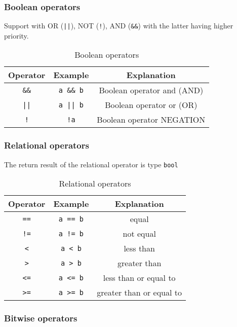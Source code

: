 \subsubsection*{Boolean operators}

Support with OR (\verb!||!), NOT (\verb|!|), AND (\verb|&&|) with the latter having higher priority.

\begin{table}
\centering
\begin{tabular}{c|c|c}
    Operator & Example & Explanation \\ \hline
    \verb|&&| & \verb|a && b| & Boolean operator and (AND) \\
    \verb!||! & \verb!a || b! & Boolean operator or (OR) \\
    \verb|!| & \verb|!a| & Boolean operator NEGATION \\
\end{tabular}
\caption{Boolean operators}
\end{table}

\subsubsection*{Relational operators}

The return result of the relational operator is type \texttt{bool}

\begin{table}
\centering
\begin{tabular}{c|c|c}
    Operator & Example & Explanation \\ \hline
    \verb|==| & \verb|a == b| & equal \\
    \verb|!=| & \verb|a != b| & not equal \\
    \verb|<| & \verb|a < b| & less than \\
    \verb|>| & \verb|a > b| & greater than \\
    \verb|<=| & \verb|a <= b| & less than or equal to \\
    \verb|>=| & \verb|a >= b| & greater than or equal to \\
\end{tabular}
\caption{Relational operators}
\end{table}

\subsubsection*{Bitwise operators}

